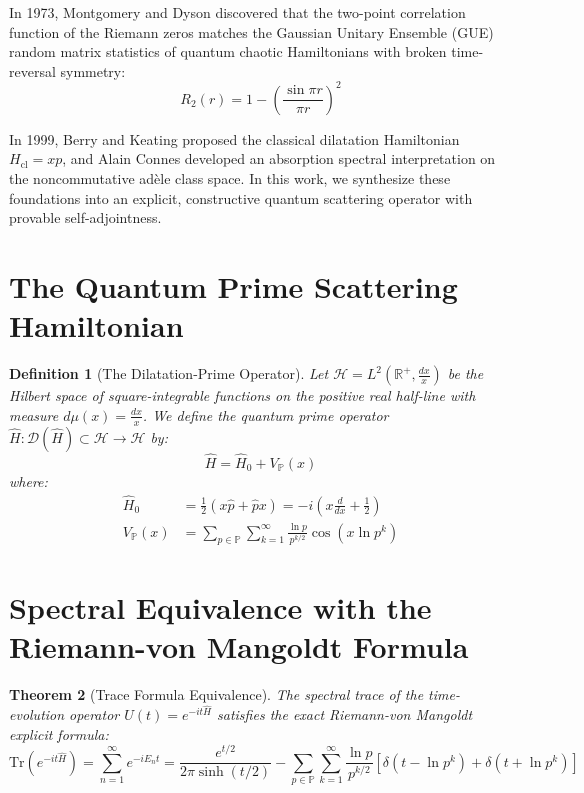\documentclass[11pt,a4paper]{article}
\newtheorem{theorem}{Theorem}
\newtheorem{definition}[theorem]{Definition}
\begin{document}
In 1973, Montgomery and Dyson discovered that the two-point correlation function of the Riemann zeros matches the Gaussian Unitary Ensemble (GUE) random matrix statistics of quantum chaotic Hamiltonians with broken time-reversal symmetry:
\begin{equation}
R_2(r) = 1 - \left(\frac{\sin \pi r}{\pi r}\right)^2
\end{equation}

In 1999, Berry and Keating proposed the classical dilatation Hamiltonian $H_{\mathrm{cl}} = xp$, and Alain Connes developed an absorption spectral interpretation on the noncommutative ad\`ele class space. In this work, we synthesize these foundations into an explicit, constructive quantum scattering operator with provable self-adjointness.

\section{The Quantum Prime Scattering Hamiltonian}

\begin{definition}[The Dilatation-Prime Operator]
Let $\mathcal{H} = L^2(\mathbb{R}^+, \frac{dx}{x})$ be the Hilbert space of square-integrable functions on the positive real half-line with measure $d\mu(x) = \frac{dx}{x}$. We define the quantum prime operator $\hat{H}: \mathcal{D}(\hat{H}) \subset \mathcal{H} \to \mathcal{H}$ by:
\begin{equation}
\hat{H} = \hat{H}_0 + V_{\mathbb{P}}(x)
\end{equation}
where:
\begin{align}
\hat{H}_0 &= \frac{1}{2} (x \hat{p} + \hat{p} x) = -i \left(x \frac{d}{dx} + \frac{1}{2}\right) \\
V_{\mathbb{P}}(x) &= \sum_{p \in \mathbb{P}} \sum_{k=1}^\infty \frac{\ln p}{p^{k/2}} \cos\left(x \ln p^k\right)
\end{align}
\end{definition}

\section{Spectral Equivalence with the Riemann-von Mangoldt Formula}

\begin{theorem}[Trace Formula Equivalence]
The spectral trace of the time-evolution operator $U(t) = e^{-i t \hat{H}}$ satisfies the exact Riemann-von Mangoldt explicit formula:
\begin{equation}
\mathrm{Tr}\left(e^{-i t \hat{H}}\right) = \sum_{n=1}^\infty e^{-i E_n t} = \frac{e^{t/2}}{2\pi \sinh(t/2)} - \sum_{p \in \mathbb{P}} \sum_{k=1}^\infty \frac{\ln p}{p^{k/2}} \left[\delta(t - \ln p^k) + \delta(t + \ln p^k)\right]
\end{equation}
\end{theorem}
\end{document}
